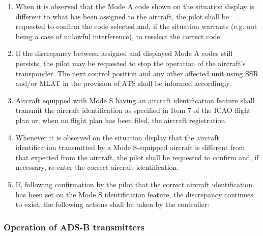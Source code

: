 \begin{enumerate}
    \item When it is observed that the Mode A code shown on the situation display is different to what has been assigned to the aircraft, the pilot shall be requested to confirm the code selected and, if the situation warrants (e.g. not being a case of unlawful interference), to reselect the correct code.
    \item If the discrepancy between assigned and displayed Mode A codes still persists, the pilot may be requested to stop the operation of the aircraft's transponder. The next control position and any other affected unit using SSR and/or MLAT in the provision of ATS shall be informed accordingly.
    \item Aircraft equipped with Mode S having an aircraft identification feature shall transmit the aircraft identification as specified in Item 7 of the ICAO flight plan or, when no flight plan has been filed, the aircraft registration.
    \item Whenever it is observed on the situation display that the aircraft identification transmitted by a Mode S-equipped aircraft is different from that expected from the aircraft, the pilot shall be requested to confirm and, if necessary, re-enter the correct aircraft identification.
    \item If, following confirmation by the pilot that the correct aircraft identification has been set on the Mode S identification feature, the discrepancy continues to exist, the following actions shall be taken by the controller:

\end{enumerate}

\subsubsection{Operation of ADS-B transmitters}

